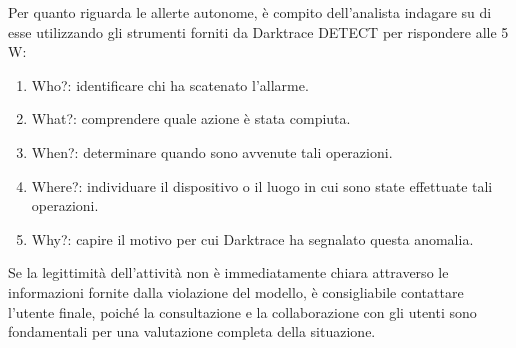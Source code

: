 Per quanto riguarda le allerte autonome, è compito dell'analista indagare su di esse utilizzando gli strumenti forniti da Darktrace DETECT per rispondere alle 5 W:
\begin{enumerate}
	\item Who?: identificare chi ha scatenato l'allarme.
	\item What?: comprendere quale azione è stata compiuta.
	\item When?: determinare quando sono avvenute tali operazioni.
	\item Where?: individuare il dispositivo o il luogo in cui sono state effettuate tali operazioni.
	\item Why?: capire il motivo per cui Darktrace ha segnalato questa anomalia.
\end{enumerate}
Se la legittimità dell'attività non è immediatamente chiara attraverso le informazioni fornite dalla violazione del modello, è consigliabile contattare l'utente finale, poiché la consultazione e la collaborazione con gli utenti sono fondamentali per una valutazione completa della situazione\cite{threat2}.

